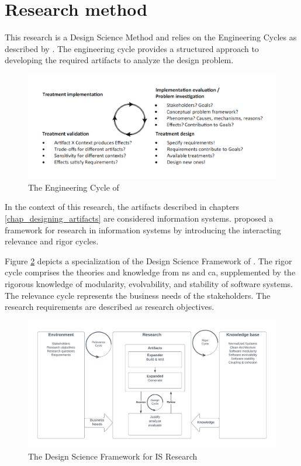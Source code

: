 \section{Research method} \label{sec_research_method}

This research is a Design Science Method and relies on the Engineering Cycles as described
by \textcite{wieringa_design_2014}. The engineering cycle provides a structured approach
to developing the required artifacts to analyze the design problem.

\begin{figure}[H]
    \centering
    \includegraphics[width=1\textwidth]{figures/engineering_cycle.pdf}
    \caption[Engineering cycle]{The Engineering Cycle of \textcite{wieringa_design_2014}}
    \label{fig_engineering_cycle}
\end{figure}

In the context of this research, the artifacts described in chapters
\ref{chap_designing_artifacts} are considered information systems.
\citeauthor{hevner_design_2004} proposed a framework for research in information systems
by introducing the interacting relevance and rigor cycles.

Figure \ref{fig_dsr} depicts a specialization of the Design Science Framework of
\textcite{hevner_design_2004}. The rigor cycle comprises the theories and knowledge from
\gls{ns} and \gls{ca}, supplemented by the rigorous knowledge of modularity, evolvability,
and stability of software systems. The relevance cycle represents the business needs of
the stakeholders. The research requirements are described as research objectives.

\begin{figure}[H]
    \centering
    \includegraphics[width=1\textwidth]{figures/rigor_relevance_cycle.pdf}
    \caption[Design Science Framework for IS Research]{The Design Science Framework for IS Research}
    \label{fig_dsr}
\end{figure}